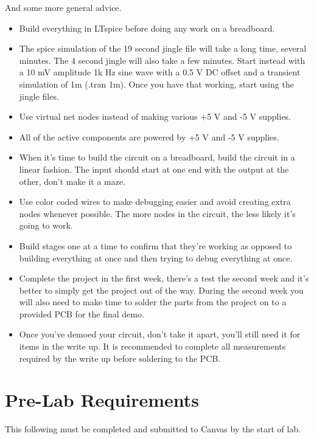 \noindent And some more general advice.

\begin{itemize}
	\item Build everything in LTspice before doing any work on a breadboard. 
	\item The spice simulation of the 19 second jingle file will take a long time, several minutes. The 4 second jingle will also take a few minutes. Start instead with a 10 mV amplitude 1k Hz sine wave with a 0.5 V DC offset and a transient simulation of 1m (.tran 1m). Once you have that working, start using the jingle files. 
	\item Use virtual net nodes instead of making various +5 V and -5 V supplies. 
	\item All of the active components are powered by +5 V and -5 V supplies.
	\item When it's time to build the circuit on a breadboard, build the circuit in a linear fashion. The input should start at one end with the output at the other, don't make it a maze.
	\item Use color coded wires to make debugging easier and avoid creating extra nodes whenever possible. The more nodes in the circuit, the less likely it's going to work.
	\item Build stages one at a time to confirm that they're working as opposed to building everything at once and then trying to debug everything at once. 
	\item Complete the project in the first week, there's a test the second week and it's better to simply get the project out of the way. During the second week you will also need to make time to solder the parts from the project on to a provided PCB for the final demo.
	\item Once you've demoed your circuit, don't take it apart, you'll still need it for items in the write up. It is recommended to complete all measurements required by the write up before soldering to the PCB.
\end{itemize}

\section{Pre-Lab Requirements}

This following must be completed and submitted to Canvas by the start of lab.

